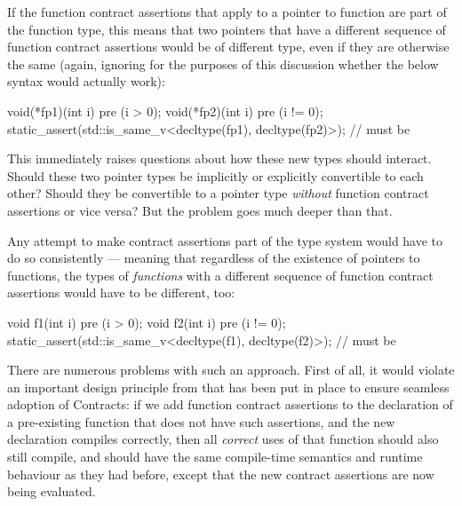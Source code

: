 If the function contract assertions that apply to a pointer to function are part of the function type, this means that two pointers that have a different sequence of function contract assertions would be of different type, even if they are otherwise the same (again, ignoring for the purposes of this discussion whether the below syntax would actually work):
\begin{codeblock}
void(*fp1)(int i) pre (i > 0);
void(*fp2)(int i) pre (i != 0);
static_assert(std::is_same_v<decltype(fp1), decltype(fp2)>);  // must be 
\end{codeblock}
This immediately raises questions about how these new types should interact. Should these two pointer types be implicitly or explicitly convertible to each other? Should they be convertible to a pointer type \emph{without} function contract assertions or vice versa? But the problem goes much deeper than that.

Any attempt to make contract assertions part of the type system would have to do so consistently --- meaning that regardless of the existence of pointers to functions, the types of \emph{functions} with a different sequence of function contract assertions would have to be different, too:

\begin{codeblock}
void f1(int i) pre (i > 0);
void f2(int i) pre (i != 0);
static_assert(std::is_same_v<decltype(f1), decltype(f2)>);  // must be 
\end{codeblock}
There are numerous problems with such an approach. First of all, it would violate an important design principle from \cite{P2900R7} that has been put in place to ensure seamless adoption of Contracts: if we add function contract assertions to the declaration of a pre-existing function that does not have such assertions, and the new declaration compiles correctly, then all \emph{correct} uses of that function should also still compile, and should have the same compile-time semantics and runtime behaviour as they had before, except that the new contract assertions are now being evaluated.


